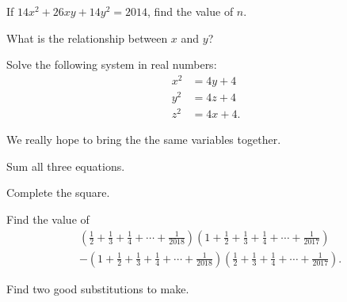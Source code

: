 \documentclass[../jarvis.tex]{subfiles}
\begin{document}
If $14x^2+26xy+14y^2=2014$, find the value of $n$.
\begin{hints}
    \begin{hint}
        What is the relationship between $x$ and $y$?
    \end{hint}
\end{hints}
\problem[2014 SMO(S) P29]Solve the following system in real numbers:
\begin{align*}
    x^2&=4y+4 \\
    y^2&=4z+4 \\
    z^2&=4x+4.
\end{align*}
\begin{hints}
    \begin{hint}
        We really hope to bring the the same variables together.
    \end{hint}
    \begin{hint}
        Sum all three equations.
    \end{hint}
    \begin{hint}
        Complete the square.
    \end{hint}
\end{hints}
\problem[2018 SMO(J) P2]Find the value of \begin{align*}
    &\left(\frac{1}{2}+\frac{1}{3}+\frac{1}{4}+\cdots+\frac{1}{2018}\right)\left(1+\frac{1}{2}+\frac{1}{3}+\frac{1}{4}+\cdots+\frac{1}{2017}\right) \\
    &-\left(1+\frac{1}{2}+\frac{1}{3}+\frac{1}{4}+\cdots+\frac{1}{2018}\right)\left(\frac{1}{2}+\frac{1}{3}+\frac{1}{4}+\cdots+\frac{1}{2017}\right).
\end{align*}
\begin{hints}
    \begin{hint}
        Find two good substitutions to make.
    \end{hint}
\end{hints}
\end{document}
